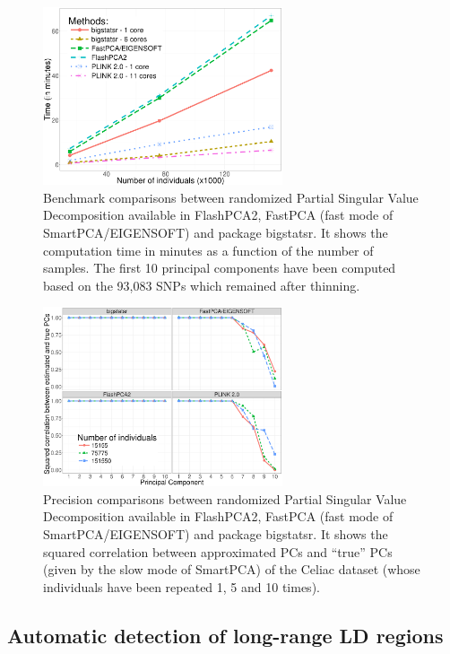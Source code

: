 \documentclass{bioinfo}
\begin{document}
\begin{figure}[!tpb]
\centerline{\includegraphics[width=200pt]{benchmark-pca.png}}
\caption{Benchmark comparisons between randomized Partial Singular Value Decomposition available in FlashPCA2, FastPCA (fast mode of SmartPCA/EIGENSOFT) and package bigstatsr. It shows the computation time in minutes as a function of the number of samples. The first 10 principal components have been computed based on the 93,083 SNPs which remained after thinning.}\label{fig:bench-pca}
\end{figure}

\begin{figure}[!tpb]
\centerline{\includegraphics[width=200pt]{precision-pca.png}}
\caption{Precision comparisons between randomized Partial Singular Value Decomposition available in FlashPCA2, FastPCA (fast mode of SmartPCA/EIGENSOFT) and package bigstatsr. It shows the squared correlation between approximated PCs and ``true'' PCs (given by the slow mode of SmartPCA) of the Celiac dataset (whose individuals have been repeated 1, 5 and 10 times).}\label{fig:prec-pca}
\end{figure}

\subsection{Automatic detection of long-range LD regions}
\end{document}
